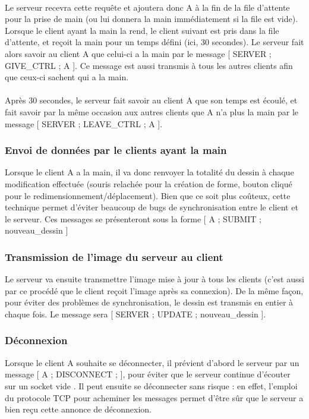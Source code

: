 \documentclass[a4paper,11pt]{article}
\begin{document}
\paragraph{} Le serveur recevra cette requête et ajoutera donc A à la fin de la file d'attente pour la prise de main (ou lui donnera la main immédiatement si la file est vide). Lorsque le client ayant la main la rend, le client suivant est pris dans la file d'attente, et reçoit la main pour un temps défini (ici, 30 secondes). Le serveur fait alors savoir au client A que celui-ci a la main par le message [ SERVER ; GIVE\_CTRL ; A ]. Ce message est aussi transmis à tous les autres clients afin que ceux-ci sachent qui a la main.

\paragraph{} Après 30 secondes, le serveur fait savoir au client A que son temps est écoulé, et fait savoir par la même occasion aux autres clients que A n'a plus la main par le message [ SERVER ; LEAVE\_CTRL ; A ].

\subsubsection{Envoi de données par le clients ayant la main}
Lorsque le client A a la main, il va donc renvoyer la totalité du dessin à chaque modification effectuée (souris relachée pour la création de forme, bouton cliqué pour le redimensionnement/déplacement). Bien que ce soit plus coûteux, cette technique permet d'éviter beaucoup de bugs de synchronisation entre le client et le serveur. Ces messages se présenteront sous la forme [ A ; SUBMIT ; nouveau\_dessin ]

\subsubsection{Transmission de l'image du serveur au client}
Le serveur va ensuite transmettre l'image mise à jour à tous les clients (c'est aussi par ce procédé que le client reçoit l'image après sa connexion). De la même façon, pour éviter des problèmes de synchronisation, le dessin est transmis en entier à chaque fois. Le message sera [ SERVER ; UPDATE ; nouveau\_dessin ].

\subsubsection{Déconnexion}
Lorsque le client A souhaite se déconnecter, il prévient d'abord le serveur par un message [ A ; DISCONNECT ; ], pour éviter que le serveur continue d'écouter sur un socket \og vide \fg. Il peut ensuite se déconnecter sans risque : en effet, l'emploi du protocole TCP pour acheminer les messages permet d'être sûr que le serveur a bien reçu cette annonce de déconnexion.
\end{document}
